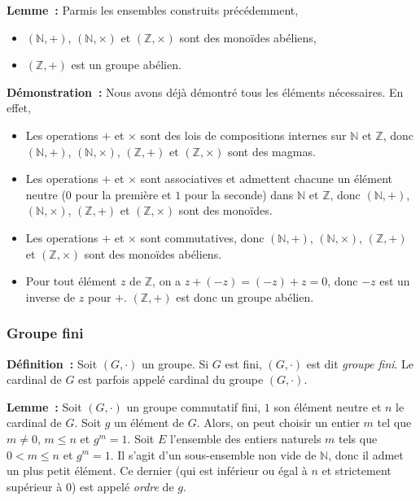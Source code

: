 \noindent\textbf{Lemme :} Parmis les ensembles construits précédemment, 
    \begin{itemize}[nosep]
        \item $(\mathbb{N},+)$, $(\mathbb{N},\times)$ et $(\mathbb{Z},\times)$ sont des monoïdes abéliens,
        \item $(\mathbb{Z},+)$ est un groupe abélien.
    \end{itemize}

\medskip

\noindent\textbf{Démonstration :} Nous avons déjà démontré tous les éléments nécessaires. 
    En effet, 
    \begin{itemize}[nosep]
        \item Les operations $+$ et $\times$ sont des lois de compositions internes sur $\mathbb{N}$ et $\mathbb{Z}$, donc $(\mathbb{N},+)$, $(\mathbb{N},\times)$, $(\mathbb{Z},+)$ et $(\mathbb{Z},\times)$ sont des magmas.
        \item Les operations $+$ et $\times$ sont associatives et admettent chacune un élément neutre ($0$ pour la première et $1$ pour la seconde) dans $\mathbb{N}$ et $\mathbb{Z}$, donc $(\mathbb{N},+)$, $(\mathbb{N},\times)$, $(\mathbb{Z},+)$ et $(\mathbb{Z},\times)$ sont des monoïdes.
        \item Les operations $+$ et $\times$ sont commutatives, donc $(\mathbb{N},+)$, $(\mathbb{N},\times)$, $(\mathbb{Z},+)$ et $(\mathbb{Z},\times)$ sont des monoïdes abéliens.
        \item Pour tout élément $z$ de $\mathbb{Z}$, on a $z + (-z) = (-z) + z = 0$, donc $-z$ est un inverse de $z$ pour $+$. 
            $(\mathbb{Z},+)$ est donc un groupe abélien.
    \end{itemize}

\subsubsection{Groupe fini}

\noindent\textbf{Définition :} Soit $(G, \cdot)$ un groupe. Si $G$ est fini, $(G, \cdot)$ est dit \textit{groupe fini}.
    Le cardinal de $G$ est parfois appelé cardinal du groupe $(G, \cdot)$.

\medskip

\noindent\textbf{Lemme :} Soit $(G, \cdot)$ un groupe commutatif fini, $1$ son élément neutre et $n$ le cardinal de $G$. 
    Soit $g$ un élément de $G$. 
    Alors, on peut choisir un entier $m$ tel que $m \neq 0$, $m \leq n$ et $g^m = 1$. 
    Soit $E$ l'ensemble des entiers naturels $m$ tels que $0 < m \leq n$ et $g^m = 1$.
    Il s'agit d'un sous-ensemble non vide de $\mathbb{N}$, donc il admet un plus petit élément. 
    Ce dernier (qui est inférieur ou égal à $n$ et strictement supérieur à $0$) est appelé \textit{ordre} de $g$.

